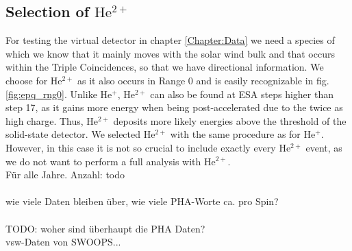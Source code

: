 \subsection{Selection of $\mathrm{He^{2+}}$}
For testing the virtual detector in chapter \ref{Chapter:Data} we need a species of which we know that it mainly moves with the solar wind bulk and that occurs within the Triple Coincidences, so that we have directional information. We choose for $\mathrm{He^{2+}}$ as it also occurs in Range 0 and is easily recognizable in fig. \ref{fig:epq_rng0}.
Unlike $\mathrm{He^{+}}$, $\mathrm{He^{2+}}$ can also be found at ESA steps higher than step 17, as it gains more energy when being post-accelerated due to the twice as high charge. Thus, $\mathrm{He^{2+}}$ deposits more likely energies above the threshold of the solid-state detector. 
We selected $\mathrm{He^{2+}}$ with the same procedure as for $\mathrm{He^{+}}$. However, in this case it is not so crucial to include exactly every $\mathrm{He^{2+}}$ event, as we do not want to perform a full analysis with $\mathrm{He^{2+}}$.
\\
Für alle Jahre. Anzahl: todo
\\ \\
wie viele Daten bleiben über, wie viele PHA-Worte ca. pro Spin?
\\ \\
TODO: woher sind überhaupt die PHA Daten?\\
vsw-Daten von SWOOPS...
\\ \\
%
%
%


